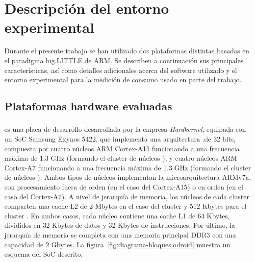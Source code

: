 \section{Descripción del entorno experimental}

Durante el presente trabajo se han utilizado dos plataformas distintas basadas en el paradigma big.LITTLE de ARM.
Se describen a continuación sus principales características, así como detalles adicionales acerca del software 
utilizado y el entorno experimental para la medición de consumo usado en parte del trabajo.

\subsection{Plataformas hardware evaluadas}

\subsubsection{\odroid}
\odroidxu es una placa de desarrollo desarrollada por la empresa {\em
  Hardkernel}, equipada con un SoC Samsung Exynos 5422, que implementa una
arquitectura \BIG.\LITTLE de 32 bits, compuesta por cuatro núcleos ARM
Cortex-A15 funcionando a una frecuencia máxima de 1.3 GHz (formando el
cluster de núcleos \BIG), y cuatro núcleos ARM Cortex-A7 funcionando a una
frecuencia máxima de 1.3 GHz (formando el cluster de núcleos
\LITTLE). Ambos tipos de núcleos implementan la microarquitectura ARMv7a,
con procesamiento fuera de orden (en el caso del Cortex-A15) o en orden (en
el caso del Cortex-A7). A nivel de jerarquía de memoria, los núcleos de
cada cluster comparten una cache L2 de 2 Mbytes en el caso del cluster \BIG
y 512 Kbytes para el cluster \LITTLE. En ambos casos, cada núcleo contiene
una cache L1 de 64 Kbytes, divididos en 32 Kbytes de datos y 32 Kbytes de
instrucciones. Por último, la jerarquía de memoria se completa con una
memoria principal DDR3 con una capacidad de 2 Gbytes. La
figura~\ref{fig:diagrama-bloques:odroid} muestra un esquema del SoC
descrito.

\subsubsection{\juno}

